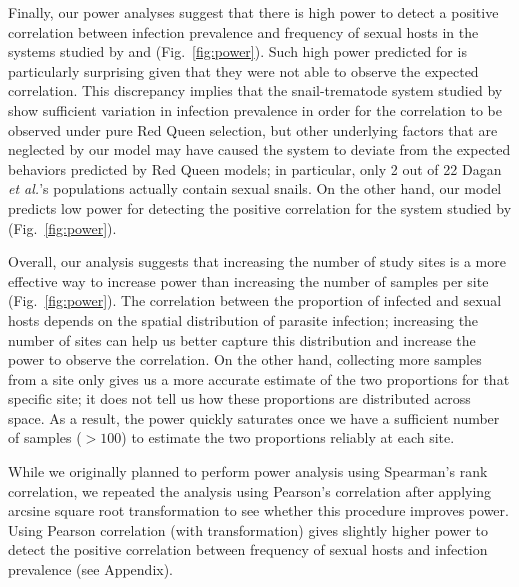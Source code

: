 \documentclass{article}\usepackage[]{graphicx}\usepackage[]{color}
\newcommand{\fref}[1]{Fig.~\ref{fig:#1}}
\begin{document}
Finally, our power analyses suggest that there is high power to detect a positive correlation between infection prevalence and frequency of sexual hosts in the systems studied by \cite{dagan2013clonal} and \cite{mckone2016fine} (\fref{power}).
Such high power predicted for \cite{dagan2013clonal} is particularly surprising given that they were not able to observe the expected correlation.
This discrepancy implies that the snail-trematode system studied by \cite{dagan2013clonal} show sufficient variation in infection prevalence in order for the correlation to be observed under pure Red Queen selection, but other underlying factors that are neglected by our model may have caused the system to deviate from the expected behaviors predicted by Red Queen models; in particular, only 2 out of 22 Dagan \emph{et al.}'s populations actually contain sexual snails.
On the other hand, our model predicts low power for detecting the positive correlation for the system studied by \cite{vergara2014infection} (\fref{power}).

Overall, our analysis suggests that increasing the number of study sites is a more effective way to increase power than increasing the number of samples per site (\fref{power}).
The correlation between the proportion of infected and sexual hosts depends on the spatial distribution of parasite infection; 
increasing the number of sites can help us better capture this distribution and increase the power to observe the correlation.
On the other hand, collecting more samples from a site only gives us a more accurate estimate of the two proportions for that specific site; it does not tell us how these proportions are distributed across space.
As a result, the power quickly saturates once we have a sufficient number of samples ($> 100$) to estimate the two proportions reliably at each site.

While we originally planned to perform power analysis using Spearman's rank correlation,
we repeated the analysis using Pearson's correlation after applying arcsine square root transformation \citep{lively1992parthenogenesis} to see whether this procedure improves power.
Using Pearson correlation (with transformation) gives slightly higher power to detect the positive correlation between frequency of sexual hosts and infection prevalence (see Appendix).
\end{document}
